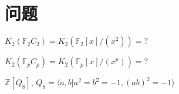 \chapter{问题}
$K_2(\mathbb{F}_2C_2)=K_2(\mathbb{F}_2[x]/(x^2)) = ?$

$K_2(\mathbb{F}_pC_p)=K_2(\mathbb{F}_p[x]/(x^p)) = ?$

$\mathbb{Z}[Q_8]$, $Q_8 = \langle a,b | a^2=b^2=-1,(ab)^2=-1\rangle$
